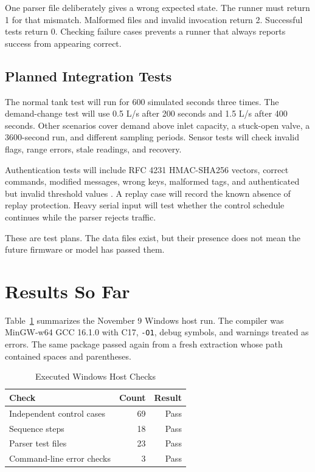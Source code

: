 \documentclass[conference]{IEEEtran}
\begin{document}
One parser file deliberately gives a wrong expected state. The runner must return 1 for that mismatch. Malformed files and invalid invocation return 2. Successful tests return 0. Checking failure cases prevents a runner that always reports success from appearing correct.

\subsection{Planned Integration Tests}
The normal tank test will run for 600 simulated seconds three times. The demand-change test will use 0.5 L/s after 200 seconds and 1.5 L/s after 400 seconds. Other scenarios cover demand above inlet capacity, a stuck-open valve, a 3600-second run, and different sampling periods. Sensor tests will check invalid flags, range errors, stale readings, and recovery.

Authentication tests will include RFC 4231 HMAC-SHA256 vectors, correct commands, modified messages, wrong keys, malformed tags, and authenticated but invalid threshold values \cite{rfc}. A replay case will record the known absence of replay protection. Heavy serial input will test whether the control schedule continues while the parser rejects traffic.

These are test plans. The data files exist, but their presence does not mean the future firmware or model has passed them.

\section{Results So Far}
Table~\ref{tab:results} summarizes the November 9 Windows host run. The compiler was MinGW-w64 GCC 16.1.0 with C17, \texttt{-O1}, debug symbols, and warnings treated as errors. The same package passed again from a fresh extraction whose path contained spaces and parentheses.
\begin{table}[ht]
\caption{Executed Windows Host Checks}
\label{tab:results}
\centering
\begin{tabular}{lrr}
\hline
Check & Count & Result \\
\hline
Independent control cases & 69 & Pass \\
Sequence steps & 18 & Pass \\
Parser test files & 23 & Pass \\
Command-line error checks & 3 & Pass \\
\hline
\end{tabular}
\end{table}
\end{document}
